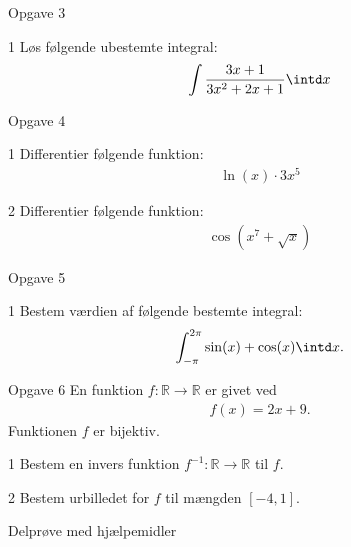 \begin{opgavetekst}{Opgave 3}
\end{opgavetekst}
\begin{delopgave}{}{1}
	Løs følgende ubestemte integral:
	\begin{align*}
		\int \frac{3x+1}{3x^2+2x+1}\intd x
	\end{align*}
\end{delopgave}
\begin{opgavetekst}{Opgave 4}
\end{opgavetekst}
\begin{delopgave}{}{1}
	Differentier følgende funktion:
	\begin{align*}
		\ln(x)\cdot 3x^5
	\end{align*}
\end{delopgave}
\begin{delopgave}{}{2}
	Differentier følgende funktion:
	\begin{align*}
		\cos(x^7+\sqrt{x})
	\end{align*}
\end{delopgave}
\begin{opgavetekst}{Opgave 5}
\end{opgavetekst}
\begin{delopgave}{}{1}
	Bestem værdien af følgende bestemte integral:
	\begin{align*}
		\int_{-\pi}^{2\pi} \sin(x) + \cos(x) \intd x.
	\end{align*}
\end{delopgave}

\begin{opgavetekst}{Opgave 6}
	En funktion $f:\mathbb{R} \to \mathbb{R}$ er givet ved
	\begin{align*}
		f(x) = 2x+9.
	\end{align*}
	Funktionen $f$ er bijektiv. 
\end{opgavetekst}
\begin{delopgave}{}{1}
	Bestem en invers funktion $f^{-1}:\mathbb{R} \to \mathbb{R}$ til $f$. 
\end{delopgave}

\begin{delopgave}{}{2}
	Bestem urbilledet for $f$ til mængden $[-4,1]$. 
\end{delopgave}

\newpage
\begin{center}
\LARGE
Delprøve med hjælpemidler 
\end{center}

